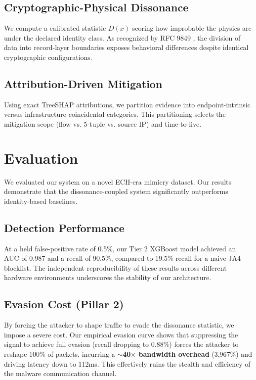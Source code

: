 \documentclass[10pt, conference]{IEEEtran}
\begin{document}
\subsection{Cryptographic-Physical Dissonance}
We compute a calibrated statistic $D(x)$ scoring how improbable the physics are under the declared identity class. As recognized by RFC 9849 \cite{rfc9849}, the division of data into record-layer boundaries exposes behavioral differences despite identical cryptographic configurations.

\subsection{Attribution-Driven Mitigation}
Using exact TreeSHAP attributions, we partition evidence into endpoint-intrinsic versus infrastructure-coincidental categories. This partitioning selects the mitigation scope (flow vs. 5-tuple vs. source IP) and time-to-live.

\section{Evaluation}

We evaluated our system on a novel ECH-era mimicry dataset. Our results demonstrate that the dissonance-coupled system significantly outperforms identity-based baselines.

\subsection{Detection Performance}
At a held false-positive rate of 0.5\%, our Tier 2 XGBoost model achieved an AUC of 0.987 and a recall of 90.5\%, compared to 19.5\% recall for a naive JA4 blocklist. The independent reproducibility of these results across different hardware environments underscores the stability of our architecture.

\subsection{Evasion Cost (Pillar 2)}
By forcing the attacker to shape traffic to evade the dissonance statistic, we impose a severe cost. Our empirical evasion curve shows that suppressing the signal to achieve full evasion (recall dropping to 0.88\%) forces the attacker to reshape 100\% of packets, incurring a \textbf{$\sim$40$\times$ bandwidth overhead} (3,967\%) and driving latency down to 112ms. This effectively ruins the stealth and efficiency of the malware communication channel.
\end{document}
